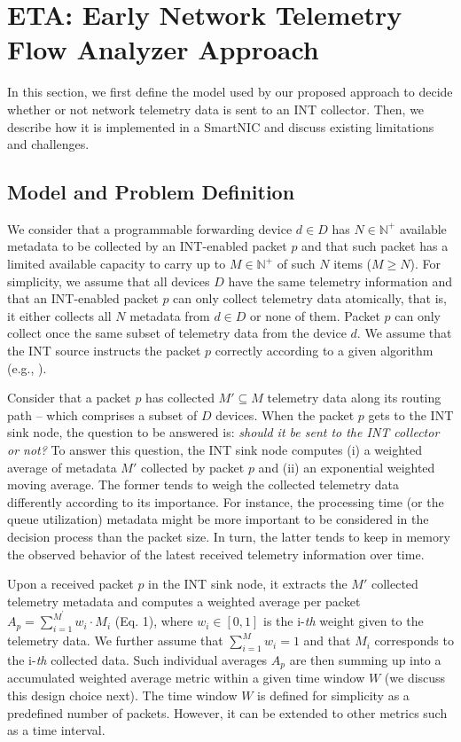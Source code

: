 \section{ETA: Early Network Telemetry Flow Analyzer Approach}

In this section, we first define the model used by our proposed approach to decide whether or not network telemetry data is sent to an INT collector. Then, we describe how it is implemented in a SmartNIC and discuss existing limitations and challenges.

\subsection{Model and Problem Definition}

We consider that a programmable forwarding device $d \in D$ has $N \in \mathbb{N}^{+}$ available metadata to be collected by an INT-enabled packet $p$ and that such packet has a limited available capacity to carry up to $M \in \mathbb{N}^{+}$ of such $N$ items ($M \geq N$). For simplicity, we assume that all devices $D$ have the same telemetry information and that an INT-enabled packet $p$ can only collect telemetry data atomically, that is, it either collects all $N$ metadata from $d \in D$ or none of them. Packet $p$ can only collect once the same subset of telemetry data from the device $d$. We assume that the INT source instructs the packet $p$ correctly according to a given algorithm (e.g., \cite{JISA2019-int}). 

Consider that a packet $p$ has collected $M' \subseteq M$ telemetry data along its routing path -- which comprises a subset of $D$ devices. When the packet $p$ gets to the INT sink node, the question to be answered is: \textit{should it be sent to the INT collector or not?} To answer this question, the INT sink node computes (i) a weighted average of metadata $M'$ collected by packet $p$ and (ii) an exponential weighted moving average. The former tends to weigh the collected telemetry data differently according to its importance. For instance, the processing time (or the queue utilization) metadata might be more important to be considered in the decision process than the packet size. In turn, the latter tends to keep in memory the observed behavior of the latest received telemetry information over time. 

Upon a received packet $p$ in the INT sink node, it extracts the $M'$ collected telemetry metadata and computes a weighted average per packet $A_p = \sum_{i = 1}^{M^{'}} w_i \cdot M_i$ (Eq. 1), where $w_i \in [0, 1]$ is the i-\textit{th} weight given to the telemetry data. We further assume that $\sum_{i = 1}^{M} w_i = 1$ and that $M_i$ corresponds to the i-\textit{th} collected data. Such individual averages $A_p$ are then summing up into a accumulated weighted average metric within a given time window $W$ (we discuss this design choice next). The time window $W$ is  defined for simplicity as a predefined number of packets. However, it can be extended to other metrics such as a time interval. 

